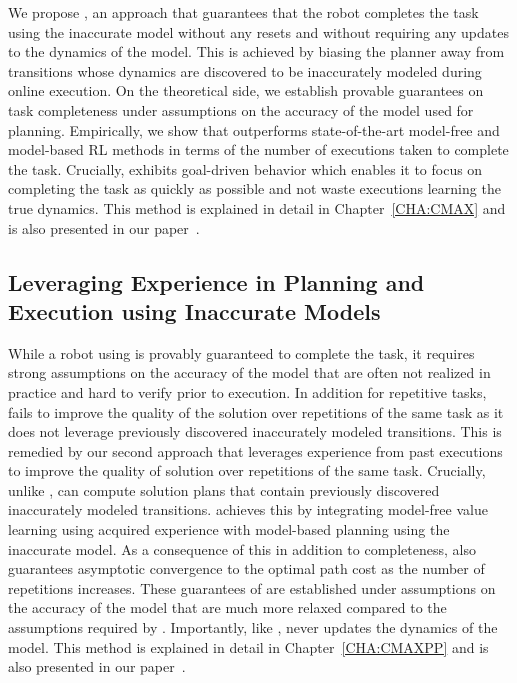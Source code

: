   We propose \cmax{}, an approach that guarantees that the robot
  completes the task using the inaccurate model without any resets and
  without requiring any updates to the dynamics of the model. This is
  achieved by biasing the planner away from transitions whose dynamics
  are discovered to be inaccurately modeled during online
  execution. On the theoretical side, we establish provable guarantees
  on task completeness under assumptions on the accuracy of the model
  used for planning. Empirically, we show that \cmax{} outperforms
  state-of-the-art model-free and model-based RL methods in terms of
  the number of executions taken to complete the task. Crucially,
  \cmax{} exhibits goal-driven behavior which enables it to focus on
  completing the task as quickly as possible and not waste executions  
  learning the true dynamics. This method is explained in detail in
  Chapter~\ref{CHA:CMAX} and is also presented in our
  paper~\cite{cmax}.

\subsection{Leveraging Experience in Planning and Execution using
  Inaccurate Models}
\label{sec:lever-exper-plann}
  
While a robot using \cmax{} is provably guaranteed to complete
  the task, it requires strong assumptions on the accuracy of the
  model that are often not realized in practice and hard to verify
  prior to execution. In addition for repetitive tasks, \cmax{} fails
  to improve the quality of the solution over repetitions of the same
  task as it does not leverage previously discovered inaccurately
  modeled transitions. This is remedied by our second approach
  \cmaxpp{} that leverages experience from past executions to improve
  the quality of solution over repetitions of the same
  task. Crucially, unlike \cmax{}, \cmaxpp{} can compute solution
  plans that contain previously discovered inaccurately modeled
  transitions. \cmaxpp{} achieves this by integrating model-free value
  learning using acquired experience with model-based planning using
  the inaccurate model. As a consequence of this in addition to
  completeness, \cmaxpp{} also guarantees asymptotic convergence to
  the optimal path cost as the number of repetitions increases. These
  guarantees of \cmaxpp{} are established under assumptions on the
  accuracy of the model that are much more relaxed compared to the
  assumptions required by \cmax{}. Importantly, like \cmax{},
  \cmaxpp{} never updates the dynamics of the model. This method is
  explained in detail in Chapter~\ref{CHA:CMAXPP} and is also
  presented in our paper~\cite{cmaxpp}.




